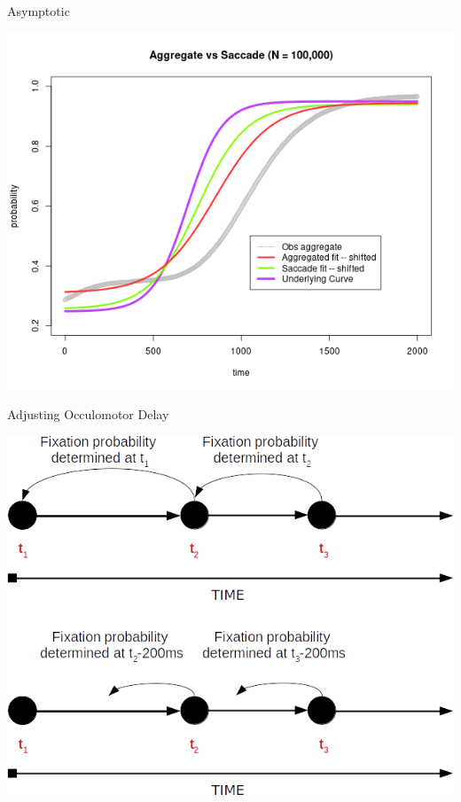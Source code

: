 \documentclass{beamer}
\begin{document}
\begin{frame}{Asymptotic}
\begin{center}
\includegraphics[scale=0.45]{img/asy_fit.png}
\end{center}
\end{frame}

\begin{frame}{Adjusting Occulomotor Delay}
\begin{center}
\includegraphics[scale=0.4]{img/occulomotor_delay_2.png}
\end{center}
\end{frame}
\end{document}

